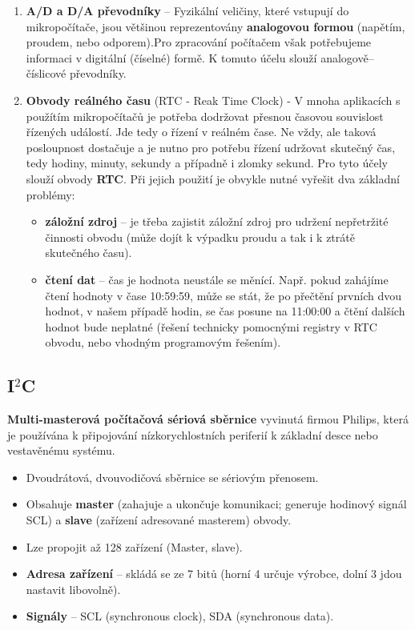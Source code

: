 \begin{enumerate}
\item \textbf{A/D a D/A převodníky} -- Fyzikální veličiny, které vstupují do mikropočítače, jsou většinou reprezentovány
\textbf{analogovou formou} (napětím, proudem, nebo odporem).Pro zpracování počítačem však potřebujeme informaci v digitální (číselné) formě. K tomuto účelu slouží analogově–číslicové převodníky.
\item \textbf{Obvody reálného času} (RTC - Reak Time Clock) - V mnoha aplikacích s použítím mikropočítačů je potřeba dodržovat přesnou časovou souvislost řízených událostí. Jde tedy o řízení v reálném čase. Ne vždy, ale taková posloupnost dostačuje a je nutno pro potřebu řízení udržovat skutečný čas, tedy hodiny, minuty, sekundy a případně i zlomky sekund. Pro tyto účely slouží obvody \textbf{RTC}. Při jejich použití je obvykle nutné vyřešit dva základní problémy:
\begin{itemize}
\item \textbf{záložní zdroj} -- je třeba zajistit záložní zdroj pro udržení nepřetržité činnosti obvodu (může dojít k výpadku proudu a tak i k ztrátě skutečného času).
\item \textbf{čtení dat} -- čas je hodnota neustále se měnící. Např. pokud zahájíme čtení hodnoty v čase 10:59:59, může se stát, že po přečtění prvních dvou hodnot, v našem případě hodin, se čas posune na 11:00:00 a čtění dalších hodnot bude neplatné (řešení technicky pomocnými registry v RTC obvodu, nebo vhodným programovým řešením). 
\end{itemize}
\end{enumerate}

\subsection{I$^2$C}
\textbf{Multi-masterová počítačová sériová sběrnice} vyvinutá firmou Philips, která je používána k připojování nízkorychlostních periferií k základní desce nebo vestavěnému systému.
\begin{itemize}
\item Dvoudrátová, dvouvodičová sběrnice se sériovým přenosem.
\item Obsahuje \textbf{master} (zahajuje a ukončuje komunikaci; generuje hodinový signál SCL) a \textbf{slave} (zařízení adresované masterem) obvody.
\item Lze propojit až 128 zařízení (Master, slave).
\item \textbf{Adresa zařízení} -- skládá se ze 7 bitů (horní 4 určuje výrobce, dolní 3 jdou nastavit libovolně).
\item \textbf{Signály} -- SCL (synchronous clock), SDA (synchronous data).
\end{itemize}